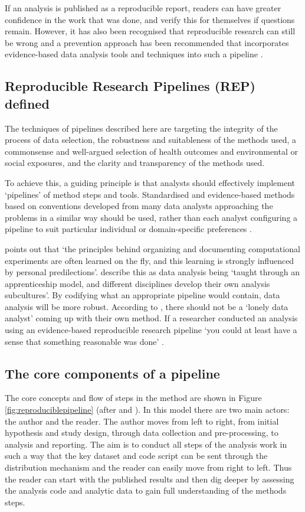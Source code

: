 \documentclass[11pt,a4paper]{article}
\begin{document}
If an analysis is published as a reproducible report, readers can have greater confidence 
in the work that was done, and verify this for themselves if questions remain. However, it has also been recognised that reproducible research can still be wrong and a
prevention approach has been recommended that incorporates
evidence-based data analysis tools and techniques into such a pipeline
\citep{Leek2015a}.

\subsection{Reproducible Research Pipelines (REP) defined}


The techniques of pipelines described here are targeting the integrity
of the process of data selection, the robustness and suitableness of the
methods used, a commonsense and well-argued selection of health outcomes
and environmental or social exposures, and the clarity and transparency
of the methods used.

To achieve this, a guiding principle is that analysts should effectively
implement `pipelines' of method steps and tools. Standardised and
evidence-based methods based on conventions developed from many data
analysts approaching the problems in a similar way should be used,
rather than each analyst configuring a pipeline to suit particular
individual or domain-specific preferences \citep{Borer2009a,White2013}.

\citet{Noble2009} points out that `the principles behind organizing and
documenting computational experiments are often learned on the fly, and
this learning is strongly influenced by personal predilections'. 
\citet{Leek2015b} describe this as data analysis being `taught through an
apprenticeship model, and different disciplines develop their own
analysis subcultures'. By codifying what an appropriate pipeline would
contain, data analysis will be more robust. According to \citet{Peng},
there should not be a `lonely data analyst' coming up with their own
method. If a researcher conducted an analysis using an evidence-based
reproducible research pipeline `you could at least have a sense that
something reasonable was done' \citep{Peng}.

\subsection{The core components of a pipeline}\label{the-core-components-of-a-pipeline}

The core concepts and flow of steps in the method are shown in Figure
\ref{fig:reproduciblepipeline} (after \citet{Peng2006} and
\citet{Solymos2008}).  In this model there are two main
actors: the author and the reader.  The author moves from left to
right, from initial hypothesis and study design, through data
collection and pre-processing, to analysis and reporting. The aim is
to conduct all steps of the analysis work in such a way that the key
dataset and code script can be sent through the distribution mechanism
and the reader can easily move from right to left. Thus the reader can
start with the published results and then dig deeper by assessing the
analysis code and analytic data to gain full understanding of the
methods steps.
\end{document}
